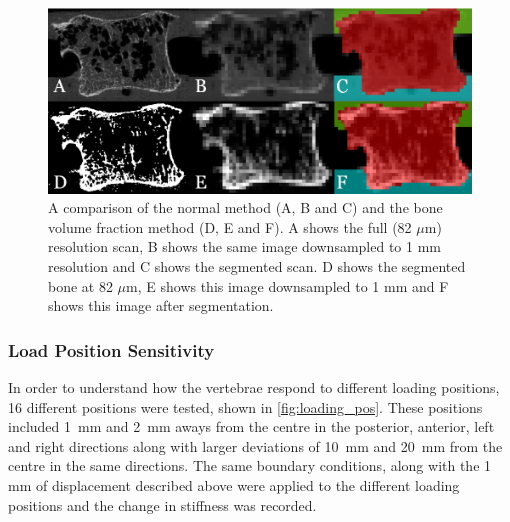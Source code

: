 \begin{figure}[ht!]
\centering
\includegraphics[width=.65\textwidth]{Chapters/Chapter_HT_images/normal_vs_bvtv_seg.png}
	\caption{A comparison of the normal method (A, B and C) and the bone volume
fraction method (D, E and F). A shows the full (82 $\mu$m) resolution scan, B
shows the same image downsampled to 1 mm resolution and C shows the segmented
scan. D shows the segmented bone at 82 $\mu$m, E shows this image downsampled
to 1 mm and F shows this image after segmentation.}
\label{fig:normal_vs_bv_tv_seg}
\end{figure}






\subsubsection{Load Position Sensitivity}

In order to understand how the vertebrae respond to different loading
positions, 16 different positions were tested, shown in
\cref{fig:loading_pos}.
These positions included 1~mm and 2~mm aways from the centre in the posterior,
anterior, left and right directions along with larger deviations of 10~mm and
20~mm from the centre in the same directions.
The same boundary conditions, along with the 1 mm of displacement described
above were applied to the different loading positions and the change in
stiffness was recorded.

